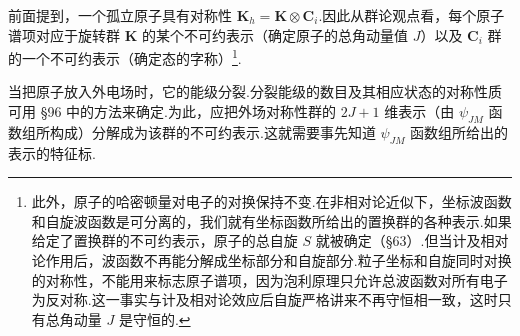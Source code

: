 前面提到，一个孤立原子具有对称性 $\boldsymbol{K}_h=\boldsymbol{K}\otimes\boldsymbol{C}_i$.因此从群论观点看，每个原子谱项对应于旋转群 $\boldsymbol{K}$ 的某个不可约表示（确定原子的总角动量值 $J$）以及 $\boldsymbol{C}_i$ 群的一个不可约表示（确定态的字称）\footnote{此外，原子的哈密顿量对电子的对换保持不变.在非相对论近似下，坐标波函数和自旋波函数是可分离的，我们就有坐标函数所给出的置换群的各种表示.如果给定了置换群的不可约表示，原子的总自旋 $S$ 就被确定（§63）.但当计及相对论作用后，波函数不再能分解成坐标部分和自旋部分.粒子坐标和自旋同时对换的对称性，不能用来标志原子谱项，因为泡利原理只允许总波函数对所有电子为反对称.这一事实与计及相对论效应后自旋严格讲来不再守恒相一致，这时只有总角动量 $J$ 是守恒的.}.

当把原子放入外电场时，它的能级分裂.分裂能级的数目及其相应状态的对称性质可用 §96 中的方法来确定.为此，应把外场对称性群的 $2J+1$ 维表示（由 $\psi_{JM}$ 函数组所构成）分解成为该群的不可约表示.这就需要事先知道 $\psi_{JM}$ 函数组所给出的表示的特征标.

